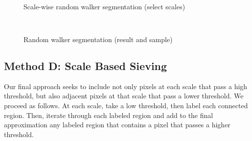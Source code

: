 \begin{figure}[p] \centering
  \\[-0.5cm]
  \\[-0.5cm]
  \\[-0.5cm]
  \caption{Scale-wise random walker segmentation (select scales)}
  \label{fig:rw-demo-scalewise}
\end{figure}


\begin{figure} \centering
  \\
  \caption{Random walker segmentation (result and sample)}
  \label{fig:rw-demo-merged}
\end{figure}

\subsection{Method D: Scale Based Sieving}

Our final approach seeks to include not only pixels at each scale that pass a high threshold, but also adjacent pixels at that scale that pass a lower threshold. We proceed as follows. At each scale, take a low threshold, then label each connected region. Then, iterate through each labeled region and add to the final approximation any labeled region that contains a pixel that passes a higher threshold.

